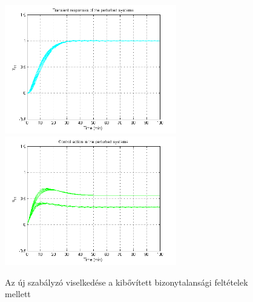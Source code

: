 \begin{figure}[!ht]
	\includegraphics[width=75mm,keepaspectratio]{figures/2m06/prt_new_1_.png}
	\includegraphics[width=75mm,keepaspectratio]{figures/2m06/prt_new_3_.png}
	\caption{Az új szabályzó viselkedése a kibővített bizonytalansági feltételek mellett}
	\label{fig:PrtNew}
\end{figure}




